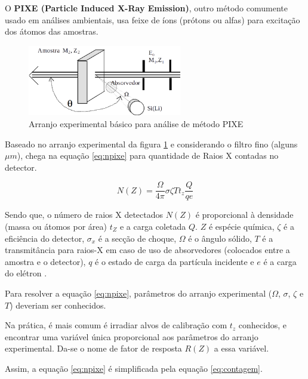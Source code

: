 O \textbf{PIXE (Particle Induced X-Ray Emission)}, 
outro método comumente usado em análises ambientais, usa feixe de íons 
(prótons ou alfas) para excitação dos átomos das amostras.

\begin{figure}[H]
\begin{center} 
  \includegraphics[width=0.6\textwidth]{../inputs/images/arranjopixe.png}
  \caption{Arranjo experimental básico para análise de método PIXE 
           \citep{tabacniks2000} \label{fig:arranjopixe}}
\end{center}
\end{figure}

Baseado no arranjo experimental da figura \ref{fig:arranjopixe} e
considerando o filtro fino (alguns $\mu m$),
\citep{tabacniks2000} chega na equação \ref{eq:npixe} para quantidade de Raios X
contadas no detector. 

\begin{equation}
  \label{eq:npixe}
  N(Z) = \frac{\Omega}{4\pi} \sigma \zeta T t_z \frac{Q}{qe}
\end{equation}

Sendo que, o número de raios X detectados $N(Z)$ é proporcional à 
densidade (massa ou átomos por área) $t_Z$ e a carga coletada $Q$.
$Z$ é espécie química, $\zeta$ é a eficiência do detector, 
$\sigma_x$ é a secção de choque, $\Omega$ é o ângulo sólido, 
$T$ é a transmitância para raios-X em caso de uso de absorvedores 
(colocados entre a amostra e o detector), $q$ é o estado de carga da 
partícula incidente e $e$ é a carga do elétron \citep{tabacniks1983}.

Para resolver a equação \ref{eq:npixe}, parâmetros do arranjo experimental
($\Omega$, $\sigma$, $\zeta$ e $T$) deveriam ser conhecidos. 

Na prática, é mais comum é irradiar alvos de calibração com $t_z$ conhecidos,
e encontrar uma variável única proporcional aos parâmetros do arranjo experimental.
Da-se o nome de fator de resposta $R(Z)$ a essa variável.

Assim, a equação \ref{eq:npixe} é simplificada pela equação \ref{eq:contagem}.

